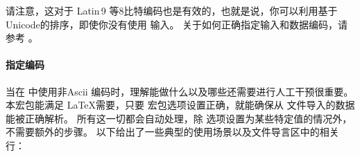 请注意，这对于  Latin\,9 等8比特编码也是有效的，也就是说，你可以利用基于Unicode的排序，即使你没有使用 \utf 输入。
关于如何正确指定输入和数据编码，请参考 。

\paragraph{指定编码}
\label{bib:cav:enc:enc}

当在  中使用非Ascii 编码时，理解\biblatex 能做什么以及哪些还需要进行人工干预很重要。
本宏包能满足 \LaTeX 需要，只要  宏包选项设置正确，就能确保从  文件导入的数据能被正确解析。
所有这一切都会自动处理，除 选项设置为某些特定值的情况外，不需要额外的步骤。
以下给出了一些典型的使用场景以及文件导言区中的相关行：

